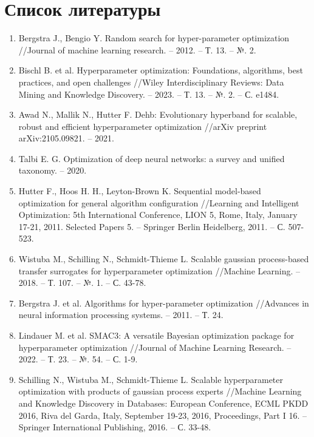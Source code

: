 \documentclass[a4paper,12pt]{article}
\begin{document}
\section{Список литературы}
\begin{enumerate}
\item Bergstra J., Bengio Y. Random search for hyper-parameter optimization //Journal of machine learning research. – 2012. – Т. 13. – №. 2.

\item Bischl B. et al. Hyperparameter optimization: Foundations, algorithms, best practices, and open challenges //Wiley Interdisciplinary Reviews: Data Mining and Knowledge Discovery. – 2023. – Т. 13. – №. 2. – С. e1484.

\item Awad N., Mallik N., Hutter F. Dehb: Evolutionary hyperband for scalable, robust and efficient hyperparameter optimization //arXiv preprint arXiv:2105.09821. – 2021.

\item Talbi E. G. Optimization of deep neural networks: a survey and unified taxonomy. – 2020.

\item Hutter F., Hoos H. H., Leyton-Brown K. Sequential model-based optimization for general algorithm configuration //Learning and Intelligent Optimization: 5th International Conference, LION 5, Rome, Italy, January 17-21, 2011. Selected Papers 5. – Springer Berlin Heidelberg, 2011. – С. 507-523.

\item Wistuba M., Schilling N., Schmidt-Thieme L. Scalable gaussian process-based transfer surrogates for hyperparameter optimization //Machine Learning. – 2018. – Т. 107. – №. 1. – С. 43-78.

\item Bergstra J. et al. Algorithms for hyper-parameter optimization //Advances in neural information processing systems. – 2011. – Т. 24.

\item Lindauer M. et al. SMAC3: A versatile Bayesian optimization package for hyperparameter optimization //Journal of Machine Learning Research. – 2022. – Т. 23. – №. 54. – С. 1-9.

\item Schilling N., Wistuba M., Schmidt-Thieme L. Scalable hyperparameter optimization with products of gaussian process experts //Machine Learning and Knowledge Discovery in Databases: European Conference, ECML PKDD 2016, Riva del Garda, Italy, September 19-23, 2016, Proceedings, Part I 16. – Springer International Publishing, 2016. – С. 33-48.


\end{enumerate}
\end{document}

